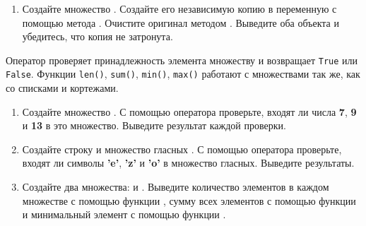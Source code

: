 \documentclass[a4,12pt]{article}
\theoremstyle{remark}
\begin{document}
\begin{enumerate}[resume]
    \begin{exercisecomment}
    Метод \texttt{pop()} удаляет и возвращает произвольный элемент. Результат может
    отличаться при каждом запуске программы.
    \end{exercisecomment}

    \item Создайте множество {}. Создайте его независимую копию в переменную {} с помощью метода {}. Очистите оригинал методом {}. Выведите оба объекта и убедитесь, что копия не затронута.

\end{enumerate}

\begin{exercisecomment}[title=Раздел 3. Проверка принадлежности и размер]
Оператор {} проверяет принадлежность элемента множеству и возвращает
\texttt{True} или \texttt{False}. Функции \texttt{len()}, \texttt{sum()}, \texttt{min()}, \texttt{max()}
работают с множествами так же, как со списками и кортежами.
\end{exercisecomment}

\begin{enumerate}[resume]

    \item Создайте множество {}. С помощью оператора {} проверьте, входят ли числа \textbf{7}, \textbf{9} и \textbf{13} в это множество. Выведите результат каждой проверки.

    \item Создайте строку {} и множество гласных {}. С помощью оператора {} проверьте, входят ли символы \textbf{'e'}, \textbf{'z'} и \textbf{'o'} в множество гласных. Выведите результаты.

    \item Создайте два множества: {} и {}. Выведите количество элементов в каждом множестве с помощью функции {}, сумму всех элементов с помощью функции {} и минимальный элемент с помощью функции {}.

\end{enumerate}
\end{document}
